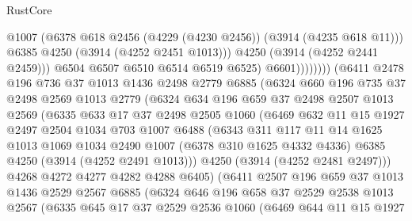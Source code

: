 \begin{lexlean}{RustCore}
\begin{coremodule}
                            @1007
                            (@6378 @618 @2456 (@4229 (@4230 @2456)) (@3914 (@4235 @618 @11)))
                            @6385
                            @4250
                            (@3914 (@4252 @2451 @1013)))
                          @4250
                          (@3914 (@4252 @2441 @2459)))
                        @6504
                        @6507
                        @6510
                        @6514
                        @6519
                        @6525)
                      @6601))))))))
      (@6411
        @2478
        @196
        @736
        @37
        @1013
        @1436
        @2498
        @2779
        @6885
        (@6324
          @660
          @196
          @735
          @37
          @2498
          @2569
          @1013
          @2779
          (@6324
            @634
            @196
            @659
            @37
            @2498
            @2507
            @1013
            @2569
            (@6335
              @633
              @17
              @37
              @2498
              @2505
              @1060
              (@6469
                @632
                @11
                @15
                @1927
                @2497
                @2504
                @1034
                @703
                @1007
                @6488
                (@6343
                  @311
                  @117
                  @11
                  @14
                  @1625
                  @1013
                  @1069
                  @1034
                  @2490
                  @1007
                  (@6378 @310 @1625 @4332 @4336)
                  @6385
                  @4250
                  (@3914 (@4252 @2491 @1013)))
                @4250
                (@3914 (@4252 @2481 @2497)))
              @4268
              @4272
              @4277
              @4282
              @4288
              @6405)
            (@6411
              @2507
              @196
              @659
              @37
              @1013
              @1436
              @2529
              @2567
              @6885
              (@6324
                @646
                @196
                @658
                @37
                @2529
                @2538
                @1013
                @2567
                (@6335
                  @645
                  @17
                  @37
                  @2529
                  @2536
                  @1060
                  (@6469
                    @644
                    @11
                    @15
                    @1927

\end{coremodule}
\end{lexlean}
